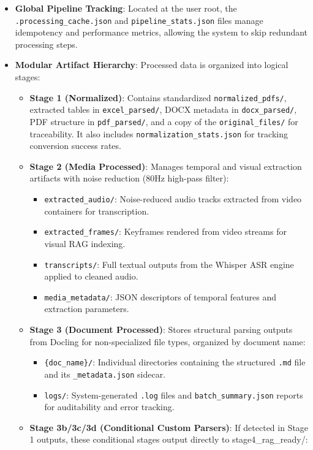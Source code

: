 \begin{itemize}
    \item \textbf{Global Pipeline Tracking}: Located at the user root, the \texttt{.processing\_cache.json} and \texttt{pipeline\_stats.json} files manage idempotency and performance metrics, allowing the system to skip redundant processing steps.
    \item \textbf{Modular Artifact Hierarchy}: Processed data is organized into logical stages:
    \begin{itemize}
        \item \textbf{Stage 1 (Normalized)}: Contains standardized \texttt{normalized\_pdfs/}, extracted tables in \texttt{excel\_parsed/}, DOCX metadata in \texttt{docx\_parsed/}, PDF structure in \texttt{pdf\_parsed/}, and a copy of the \texttt{original\_files/} for traceability. It also includes \texttt{normalization\_stats.json} for tracking conversion success rates.
        \item \textbf{Stage 2 (Media Processed)}: Manages temporal and visual extraction artifacts with noise reduction (80Hz high-pass filter):
        \begin{itemize}
            \item \texttt{extracted\_audio/}: Noise-reduced audio tracks extracted from video containers for transcription.
            \item \texttt{extracted\_frames/}: Keyframes rendered from video streams for visual RAG indexing.
            \item \texttt{transcripts/}: Full textual outputs from the Whisper ASR engine applied to cleaned audio.
            \item \texttt{media\_metadata/}: JSON descriptors of temporal features and extraction parameters.
        \end{itemize}
        \item \textbf{Stage 3 (Document Processed)}: Stores structural parsing outputs from Docling for non-specialized file types, organized by document name:
        \begin{itemize}
            \item \texttt{\{doc\_name\}/}: Individual directories containing the structured \texttt{.md} file and its \texttt{\_metadata.json} sidecar.
            \item \texttt{logs/}: System-generated \texttt{.log} files and \texttt{batch\_summary.json} reports for auditability and error tracking.
        \end{itemize}
        \item \textbf{Stage 3b/3c/3d (Conditional Custom Parsers)}: If detected in Stage 1 outputs, these conditional stages output directly to stage4\_rag\_ready/:

\end{itemize}
\end{itemize}
